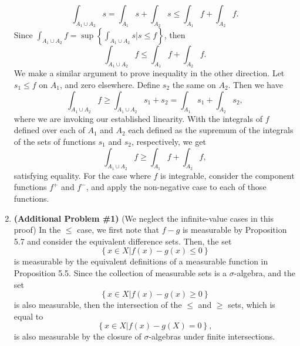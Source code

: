 \documentclass[11pt]{article}
\begin{document}
\begin{enumerate}
 \[
   \int_{A_1 \cup A_2} s = \int_{A_1}s + \int_{A_2}s \leq \int_{A_1}f + \int_{A_2}f
.\] 
Since $\int_{A_1 \cup A_2} f = \sup\left\{\int_{A_1 \cup A_2} s| s \le f \right\}$, then
 \[
   \int_{A_1 \cup A_2} f \le \int_{A_1}f + \int_{A_2}f
.\]
We make a similar argument to prove inequality in the other direction. Let $s_1 \leq f$ on $A_1$, and zero elsewhere. Define $s_2$ the same on $A_2$. Then we have
\[
  \int_{A_1 \cup A_2}f \ge \int_{A_1 \cup A_2} s_1+s_2 = \int_{A_1}s_1 + \int_{A_2} s_2
,\]
where we are invoking our established linearity. With the integrals of $f$ defined over each of $A_1$ and $A_2$ each defined as the supremum of the integrals of the sets of functions $s_1$ and $s_2$, respectively, we get
\[
  \int_{A_1 \cup A_2}f \ge \int_{A_1}f + \int_{A_2}f
,\] 
satisfying equality. For the case where $f$ is integrable, consider the component functions $f^+$ and $f^-$, and apply the non-negative case to each of those functions.
\pagebreak
  \item \textbf{(Additional Problem \#1)} (We neglect the infinite-value cases in this proof) In the $\le $ case, we first note that $f-g$ is measurable by Proposition 5.7 and consider the equivalent difference sets. Then, the set $$\left\{ x \in X | f(x) - g(x) \le 0 \right\}$$ is measurable by the equivalent definitions of a measurable function in Proposition 5.5. Since the collection of measurable sets is a $\sigma$-algebra, and the set $$\left\{ x \in X | f(x) - g(x    ) \ge 0 \right\}$$ is also measurable, then the intersection of the $\le $ and $\ge $ sets, which is equal to
 $$\left\{ x \in X | f(x) - g(X) = 0 \right\},  $$
 is also measurable by the closure of $\sigma$-algebras under finite intersections.
\end{enumerate}
\end{document}

